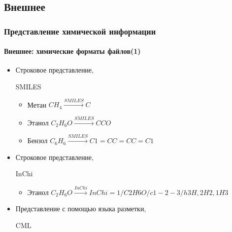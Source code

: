 \subsection{Внешнее}
\begin{frame}
  \frametitle{Представление химической информации}
  \framesubtitle{Внешнее: химические форматы файлов(1)}
  \begin{itemize}
    \item Строковое представление, \begin{tt}SMILES\end{tt}\footnotemark 
      \begin{itemize}
        \item Метан $ CH_4 \overset{SMILES}{\rightarrow} C $
        \item Этанол $ C_2H_6O \overset{SMILES}{\rightarrow} CCO $
        \item Бензол $ C_6H_6 \overset{SMILES}{\rightarrow} C1=CC=CC=C1 $
      \end{itemize}
    \item Строковое представление, \begin{tt}InChi\end{tt}\footnotemark
        \begin{itemize}
          \item Этанол $ C_2H_6O \overset{InChi}{\rightarrow} InChi=1/C2H6O/c1-2-3/h3H,2H2,1H3 $
        \end{itemize}
      \item Представление с помощью языка разметки, \begin{tt}CML\end{tt}\footnotemark
  \end{itemize}
\end{frame}

